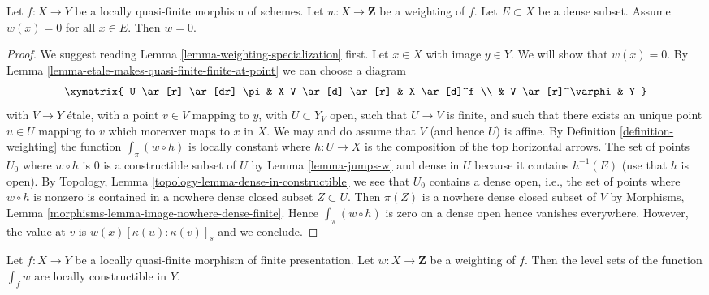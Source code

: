 \begin{lemma}
\label{lemma-weighting-on-dense-set}
Let $f : X \to Y$ be a locally quasi-finite morphism of schemes.
Let $w : X \to \mathbf{Z}$ be a weighting of $f$.
Let $E \subset X$ be a dense subset.
Assume $w(x) = 0$ for all $x \in E$. Then $w = 0$.
\end{lemma}

\begin{proof}
We suggest reading Lemma \ref{lemma-weighting-specialization} first.
Let $x \in X$ with image $y \in Y$. We will show that $w(x) = 0$. By
Lemma \ref{lemma-etale-makes-quasi-finite-finite-at-point}
we can choose a diagram
$$
\xymatrix{
U \ar[r] \ar[dr]_\pi & X_V \ar[d] \ar[r] & X \ar[d]^f \\
& V \ar[r]^\varphi & Y
}
$$
with $V \to Y$ \'etale, with a point $v \in V$ mapping to $y$,
with $U \subset Y_V$ open, such that $U \to V$ is finite, and
such that there exists an unique point $u \in U$ mapping to $v$
which moreover maps to $x$ in $X$. We may and do assume that $V$
(and hence $U$) is affine. By Definition \ref{definition-weighting}
the function $\int_\pi (w \circ h)$ is locally constant where
$h : U \to X$ is the composition of the top horizontal arrows.
The set of points $U_0$ where $w \circ h$ is $0$ is a
constructible subset of $U$ by Lemma \ref{lemma-jumps-w}
and dense in $U$ because it contains $h^{-1}(E)$ (use that $h$ is open).
By Topology, Lemma \ref{topology-lemma-dense-in-constructible}
we see that $U_0$ contains a dense open,
i.e., the set of points where $w \circ h$ is nonzero is contained
in a nowhere dense closed subset $Z \subset U$. Then $\pi(Z)$
is a nowhere dense closed subset of $V$ by
Morphisms, Lemma \ref{morphisms-lemma-image-nowhere-dense-finite}.
Hence $\int_\pi (w \circ h)$ is zero on a dense open hence
vanishes everywhere.
However, the value at $v$ is $w(x)[\kappa(u):\kappa(v)]_s$
and we conclude.
\end{proof}

\begin{lemma}
\label{lemma-jumps-int-w}
Let $f : X \to Y$ be a locally quasi-finite morphism of finite
presentation. Let $w : X \to \mathbf{Z}$ be a weighting of $f$. Then
the level sets of the function $\int_f w$ are locally constructible in $Y$.
\end{lemma}

